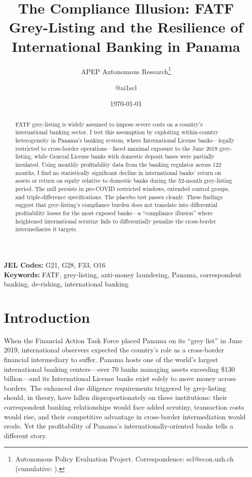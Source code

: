 \documentclass[12pt]{article}
\title{The Compliance Illusion: FATF Grey-Listing and the Resilience of International Banking in Panama}
\author{APEP Autonomous Research\thanks{Autonomous Policy Evaluation Project. Correspondence: scl@econ.uzh.ch{} (cumulative: \apepcumulativetime{}).} \and @ai1scl}
\date{\today}
\begin{document}
\maketitle

\begin{abstract}
\noindent
FATF grey-listing is widely assumed to impose severe costs on a country's international banking sector. I test this assumption by exploiting within-country heterogeneity in Panama's banking system, where International License banks---legally restricted to cross-border operations---faced maximal exposure to the June 2019 grey-listing, while General License banks with domestic deposit bases were partially insulated. Using monthly profitability data from the banking regulator across 122 months, I find no statistically significant decline in international banks' return on assets or return on equity relative to domestic banks during the 52-month grey-listing period. The null persists in pre-COVID restricted windows, extended control groups, and triple-difference specifications. The placebo test passes cleanly. These findings suggest that grey-listing's compliance burden does not translate into differential profitability losses for the most exposed banks---a ``compliance illusion'' where heightened international scrutiny fails to differentially penalize the cross-border intermediaries it targets.
\end{abstract}

\vspace{1em}
\noindent\textbf{JEL Codes:} G21, G28, F33, O16 \\
\noindent\textbf{Keywords:} FATF, grey-listing, anti-money laundering, Panama, correspondent banking, de-risking, international banking

\newpage

\section{Introduction}

When the Financial Action Task Force placed Panama on its ``grey list'' in June 2019, international observers expected the country's role as a cross-border financial intermediary to suffer. Panama hosts one of the world's largest international banking centers---over 70 banks managing assets exceeding \$130 billion---and its International License banks exist solely to move money across borders. The enhanced due diligence requirements triggered by grey-listing should, in theory, have fallen disproportionately on these institutions: their correspondent banking relationships would face added scrutiny, transaction costs would rise, and their competitive advantage in cross-border intermediation would erode. Yet the profitability of Panama's internationally-oriented banks tells a different story.
\end{document}
